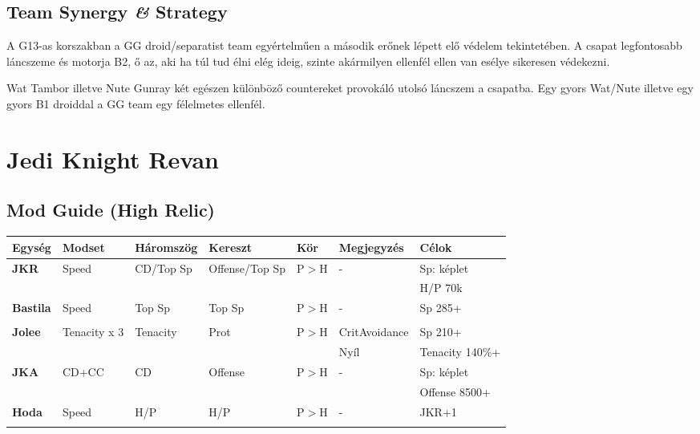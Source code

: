 \documentclass[11pt]{report}
\begin{document}
\section{Team Synergy \textit{\&} Strategy}
A G13-as korszakban a GG droid/separatist team egyértelműen a második erőnek lépett elő védelem tekintetében. A csapat legfontosabb láncszeme és motorja B2, ő az, aki ha túl tud élni elég ideig, szinte akármilyen ellenfél ellen van esélye sikeresen védekezni.\par
Wat Tambor illetve Nute Gunray két egészen különböző countereket provokáló utolsó láncszem a csapatba. Egy gyors Wat/Nute illetve egy gyors B1 droiddal a GG team egy félelmetes ellenfél.


\chapter{Jedi Knight Revan}
\section{Mod Guide (High Relic)}
\begin{center}
    \begin{tabular}{|l | l | l | l | l | l | l |}
        \hline
        Egység & Modset & Háromszög & Kereszt & Kör & Megjegyzés & Célok\\ \hline
        \textbf{JKR} & Speed & CD/Top Sp & Offense/Top Sp & P$>$H & - & Sp: képlet\\ 
        &  &  &  &  &  & H/P 70k\\ \hline
        \textbf{Bastila} & Speed & Top Sp & Top Sp & P$>$H & - & Sp 285+\\
        &  &  &  &  &  & \\ \hline        
        \textbf{Jolee} & Tenacity x 3 & Tenacity & Prot & P$>$H & CritAvoidance & Sp 210+\\
        &  &  &  &  & Nyíl & Tenacity 140\%+\\ \hline
        \textbf{JKA} & CD+CC & CD & Offense & P$>$H & - & Sp: képlet\\
        &  &  &  &  &  & Offense 8500+\\ \hline
        \textbf{Hoda} & Speed & H/P & H/P & P$>$H & - & JKR+1\\
        &  &  &  &  &  &  \\ \hline
    \end{tabular}
\end{center}
\end{document}
